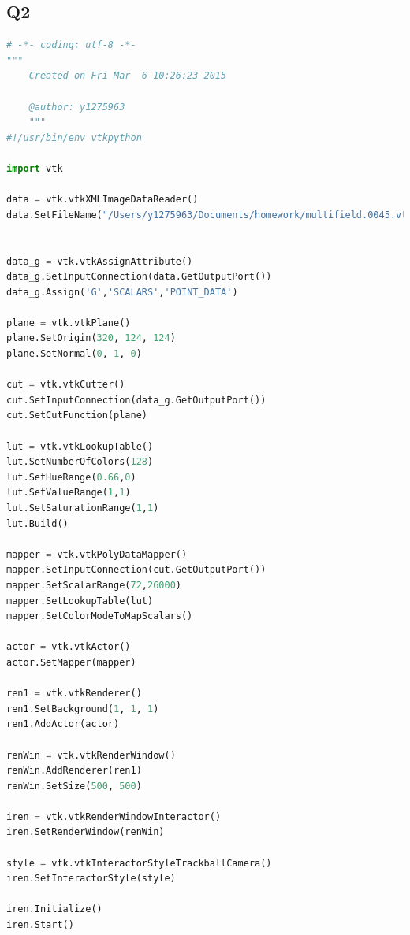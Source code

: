 \documentclass[11pt]{scrartcl}
\begin{document}
\subsection{Q2}
\label{code:Q2}
\begin{lstlisting}[language=Python]
# -*- coding: utf-8 -*-
"""
    Created on Fri Mar  6 10:26:23 2015
    
    @author: y1275963
    """
#!/usr/bin/env vtkpython

import vtk

data = vtk.vtkXMLImageDataReader()
data.SetFileName("/Users/y1275963/Documents/homework/multifield.0045.vti")


data_g = vtk.vtkAssignAttribute()
data_g.SetInputConnection(data.GetOutputPort())
data_g.Assign('G','SCALARS','POINT_DATA')

plane = vtk.vtkPlane()
plane.SetOrigin(320, 124, 124)
plane.SetNormal(0, 1, 0)

cut = vtk.vtkCutter()
cut.SetInputConnection(data_g.GetOutputPort())
cut.SetCutFunction(plane)

lut = vtk.vtkLookupTable()
lut.SetNumberOfColors(128)
lut.SetHueRange(0.66,0)
lut.SetValueRange(1,1)
lut.SetSaturationRange(1,1)
lut.Build()

mapper = vtk.vtkPolyDataMapper()
mapper.SetInputConnection(cut.GetOutputPort())
mapper.SetScalarRange(72,26000)
mapper.SetLookupTable(lut)
mapper.SetColorModeToMapScalars()

actor = vtk.vtkActor()
actor.SetMapper(mapper)

ren1 = vtk.vtkRenderer()
ren1.SetBackground(1, 1, 1)
ren1.AddActor(actor)

renWin = vtk.vtkRenderWindow()
renWin.AddRenderer(ren1)
renWin.SetSize(500, 500)

iren = vtk.vtkRenderWindowInteractor()
iren.SetRenderWindow(renWin)

style = vtk.vtkInteractorStyleTrackballCamera()
iren.SetInteractorStyle(style)

iren.Initialize()
iren.Start()
\end{lstlisting}
\end{document}
